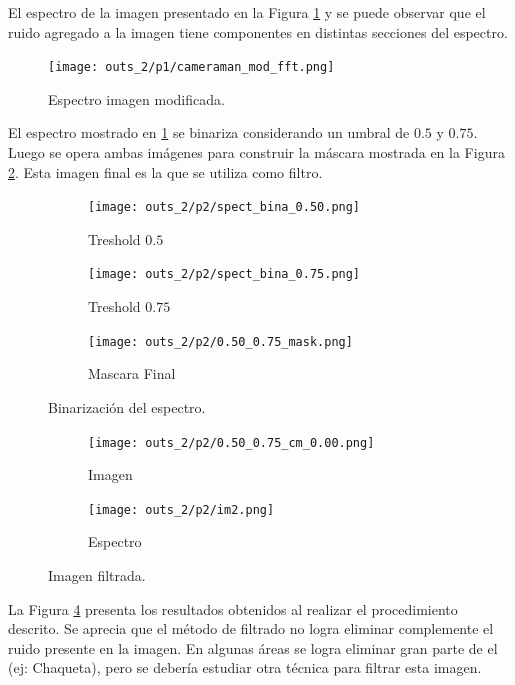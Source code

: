 \documentclass[
  letterpaper,
  twocolumn,
  9pt,
  journal,
  final]{IEEEtran}
\begin{document}
El espectro de la imagen presentado en la Figura \ref{camaraman_fft} y se puede observar que el ruido agregado a la imagen tiene componentes en distintas secciones del espectro.

\begin{figure}[!tbh]
	\texttt{[image: outs\_2/p1/cameraman\_mod\_fft.png]}
	\caption{Espectro imagen modificada.} \label{camaraman_fft}
\end{figure}

El espectro mostrado en \ref{camaraman_fft} se binariza considerando un umbral de $0.5$ y $0.75$. Luego se opera ambas imágenes para construir la máscara mostrada en la Figura \ref{mi_filtro}. Esta imagen final es la que se utiliza como filtro.

\begin{figure}[!tbh]
	\centering
  \begin{subfigure}[b]{.3\linewidth}
		\texttt{[image: outs\_2/p2/spect\_bina\_0.50.png]}
		\caption{Treshold $0.5$}
	\end{subfigure}
  \begin{subfigure}[b]{.3\linewidth}
    \texttt{[image: outs\_2/p2/spect\_bina\_0.75.png]}
		\caption{Treshold $0.75$}
	\end{subfigure}
  \begin{subfigure}[b]{.3\linewidth}
    \texttt{[image: outs\_2/p2/0.50\_0.75\_mask.png]}
		\caption{Mascara Final} \label{mi_filtro}
	\end{subfigure}
  \caption{Binarización del espectro.} \label{bin_spectrum}
\end{figure}



\begin{figure}[!tbh]
	\centering
  \begin{subfigure}[b]{.49\linewidth}
		\texttt{[image: outs\_2/p2/0.50\_0.75\_cm\_0.00.png]}
		\caption{Imagen}
	\end{subfigure}
  \begin{subfigure}[b]{.49\linewidth}
    \texttt{[image: outs\_2/p2/im2.png]}
		\caption{Espectro}
	\end{subfigure}
  \caption{Imagen filtrada.} \label{camera_filtered}
\end{figure}

La Figura \ref{camera_filtered} presenta los resultados obtenidos al realizar el procedimiento descrito. Se aprecia que el método de filtrado no logra eliminar complemente el ruido presente en la imagen. En algunas áreas se logra eliminar gran parte de el (ej: Chaqueta), pero se debería estudiar otra técnica para filtrar esta imagen.
\end{document}

